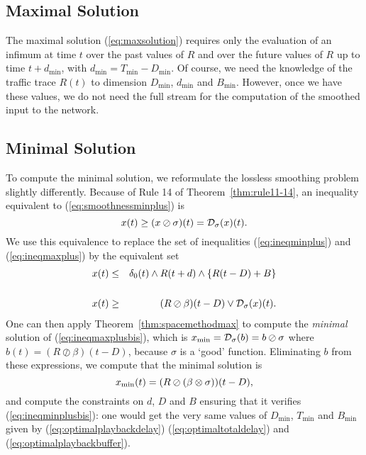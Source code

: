 \subsection{Maximal Solution}

The maximal solution (\ref{eq:maxsolution}) requires only the evaluation of an infimum
at time $t$ over the past values of $R$ and over the future values of $R$ up to time $t+d_{\min}$,
with $d_{\min} = T_{\min} - D_{\min}$.  Of course, we need the knowledge of the traffic trace $R(t)$ to dimension
$D_{\min}$, $d_{\min}$ and $B_{\min}$. However, once we have these values, we do not need
the full stream for the computation of the smoothed input to the network.

\subsection{Minimal Solution}

To compute the minimal solution, we reformulate the lossless smoothing problem slightly differently. Because of Rule 14 of
Theorem~\ref{thm:rule11-14}, an inequality equivalent to (\ref{eq:smoothnessminplus}) is
\begin{equation}
\mylabel{eq:smoothnessmaxplus}
x(t) \geq (x \oslash \sigma)(t) = \calD_{\sigma}(x)(t).
\end{equation}
We use this equivalence to replace the set of inequalities (\ref{eq:ineqminplus}) and (\ref{eq:ineqmaxplus}) by the equivalent set
\begin{eqnarray}
\mylabel{eq:ineqminplusbis}
x(t) & \leq & \delta_0 (t) \wedge R(t+d)  \wedge \{R(t-D) + B \} \nonumber \\
& & \\
\mylabel{eq:ineqmaxplusbis}
x(t) & \geq & (R \oslash \beta)(t-D) \vee  \calD_{\sigma}(x)(t) .
\end{eqnarray}
One can then apply Theorem~\ref{thm:spacemethodmax} to compute the {\em minimal} solution of (\ref{eq:ineqmaxplusbis}), which is
$ x_{\min} = \mathcal D_{\sigma}(b) = b \oslash \sigma $ where
$b(t) =(R\oslash \beta)(t-D)$,
because $\sigma$ is a `good' function. Eliminating $b$ from these expressions, we compute that the minimal solution is
\begin{equation}
\mylabel{eq:minsolution}
x_{\min}(t) = (R  \oslash (\beta \otimes \sigma))(t - D),
\end{equation}
and compute the constraints on $d$, $D$ and $B$ ensuring that it verifies (\ref{eq:ineqminplusbis}):
one would get the very same values of $D_{\min}$, $T_{\min}$ and $B_{\min}$ given by (\ref{eq:optimalplaybackdelay})
(\ref{eq:optimaltotaldelay}) and (\ref{eq:optimalplaybackbuffer}).

